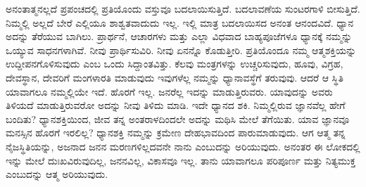 ಅನಂತಾತ್ಮನಲ್ಲದೆ ಪ್ರಪಂಚದಲ್ಲಿ ಪ್ರತಿಯೊಂದು ವಸ್ತುವೂ ಬದಲಾಯಿಸುತ್ತಿದೆ. ಬದಲಾವಣೆಯ ಸುಂಟರಗಾಳಿ ಬೀಸುತ್ತಿದೆ. ನಿಮ್ಮಲ್ಲಿ ಅಲ್ಲದೆ ಬೇರೆ ಎಲ್ಲಿಯೂ ಶಾಶ್ವತವಾದುದು ಇಲ್ಲ. ಇಲ್ಲಿ ಮಾತ್ರ ಬದಲಾಯಿಸದ ಅನಂತ ಆನಂದವಿದೆ. ಧ್ಯಾನ ಅದನ್ನು ತೆರೆಯುವ ಬಾಗಿಲು. ಪ್ರಾರ್ಥನೆ, ಆಚಾರಗಳು ಮತ್ತು ಎಲ್ಲಾ ವಿಧವಾದ ಬಾಹ್ಯಪೂಜೆಗಳೂ ಧ್ಯಾನಕ್ಕೆ ನಮ್ಮನ್ನು ಒಯ್ಯುವ ಸಾಧನಗಳಾಗಿವೆ. ನೀವು ಪ್ರಾರ್ಥಿಸುವಿರಿ. ನೀವು ಏನನ್ನೊ ಕೊಡುತ್ತೀರಿ. ಪ್ರತಿಯೊಂದೂ ನಮ್ಮ ಆತ್ಮಶಕ್ತಿಯನ್ನು ಉದ್ದೀಪನಗೊಳಿಸುವುದು ಎಂಬ ಒಂದು ಸಿದ್ದಾಂತವಿತ್ತು. ಕೆಲವು ಮಂತ್ರಗಳನ್ನು ಉಚ್ಚರಿಸುವುದು, ಹೂವು, ವಿಗ್ರಹ, ದೇವಸ್ಥಾನ, ದೇವರಿಗೆ ಮಂಗಳಾರತಿ ಮಾಡುವುದು ಇವುಗಳೆಲ್ಲ ನಮ್ಮನ್ನು ಧ್ಯಾನಾವಸ್ಥೆಗೆ ತರುವುವು. ಆದರೆ ಆ ಸ್ಥಿತಿ ಯಾವಾಗಲೂ ನಮ್ಮಲ್ಲಿಯೇ ಇದೆ. ಹೊರಗೆ ಇಲ್ಲ. ಜನರೆಲ್ಲ ಇದನ್ನು ಮಾಡುತ್ತಿರುವರು. ಯಾವುದನ್ನು ಅವರು ತಿಳಿಯದೆ ಮಾಡುತ್ತಿರುವರೋ ಅದನ್ನು ನೀವು ತಿಳಿದು ಮಾಡಿ. ಇದೇ ಧ್ಯಾನದ ಶಕಿ. ನಿಮ್ಮಲ್ಲಿರುವ ಜ್ಞಾನವೆಲ್ಲ ಹೇಗೆ ಬಂದಿತು? ಧ್ಯಾನಶಕ್ತಿಯಿಂದ, ಜೀವ ತನ್ನ ಅಂತರಾಳದಿಂದಲೇ ಅದನ್ನು ಮಥಿಸಿ ಮೇಲೆ ತೆಗೆಯಿತು. ಯಾವ ಜ್ಞಾನವೂ ಮನಸ್ಸಿನ ಹೊರಗೆ ಇರಲಿಲ್ಲ? ಧ್ಯಾನಶಕ್ತಿ ನಮ್ಮನ್ನು ಕ್ರಮೇಣ ದೇಹಭಾವದಿಂದ ಪಾರುಮಾಡುವುದು. ಆಗ ಆತ್ಮ ತನ್ನ ನೈಜಸ್ಥಿತಿಯನ್ನು, ಅಜನಾದ ಜನನ ಮರಣಗಳಿಲ್ಲದವನೇ ನಾನು ಎಂಬುದನ್ನು ಅರಿಯುವುದು. ಅನಂತರ ಈ ಲೋಕದಲ್ಲಿ ಇನ್ನು ಮೇಲೆ ದುಃಖವಿರುವುದಿಲ್ಲ, ಜನನವಿಲ್ಲ, ವಿಕಾಸವೂ ಇಲ್ಲ. ತಾನು ಯಾವಾಗಲೂ ಪರಿಪೂರ್ಣ ಮತ್ತು ನಿತ್ಯಮುಕ್ತ ಎಂಬುದನ್ನು ಆತ್ಮ ಅರಿಯುವುದು.

